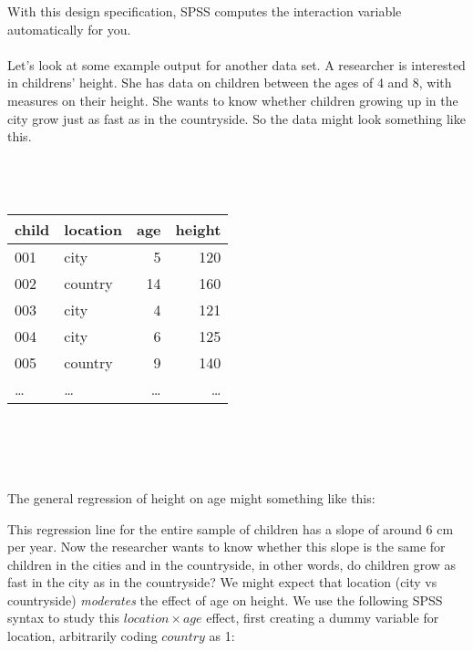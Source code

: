 With this design specification, SPSS computes the interaction variable automatically for you.
\\
\\
Let's look at some example output for another data set. A researcher is interested in childrens' height. She has data on children between the ages of 4 and 8, with measures on their height. She wants to know whether children growing up in the city grow just as fast as in the countryside. So the data might look something like this.
 \\
 \\
 \\
 \\
 \begin{tabular}{llrr}
 child & location & age & height\\ \hline
 001 & city & 5 & 120\\
 002 & country & 14 & 160\\
 003 & city & 4 & 121\\
 004 & city & 6 & 125\\
 005 & country & 9 & 140\\
 \dots & \dots & \dots & \dots\\
 \end{tabular}
\\
\\
\\
 \\
The general regression of height on age might something like this:
\begin{knitrout}
\color{fgcolor}\begin{kframe}


{\ttfamily\noindent\bfseries{}}\end{kframe}
\end{knitrout}

This regression line for the entire sample of children has a slope of around 6 cm per year. Now the researcher wants to know whether this slope is the same for children in the cities and in the countryside, in other words, do children grow as fast in the city as in the countryside? We might expect that location (city vs countryside) \textit{moderates} the effect of age on height. We use the following SPSS syntax to study this $location \times age$ effect, first creating a dummy variable for location, arbitrarily coding $country$ as 1:

